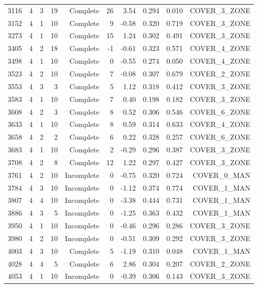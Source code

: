 \begin{tabular}{rrrrrrrrrr}
3116 & 4 & 3 & 19 & Complete & 26 & 3.54 & 0.294 & 0.010 & COVER\_3\_ZONE \\
3152 & 4 & 1 & 10 & Complete & 9 & -0.58 & 0.320 & 0.719 & COVER\_3\_ZONE \\
3273 & 4 & 1 & 10 & Complete & 15 & 1.24 & 0.302 & 0.491 & COVER\_3\_ZONE \\
3405 & 4 & 2 & 18 & Complete & -1 & -0.61 & 0.323 & 0.571 & COVER\_4\_ZONE \\
3498 & 4 & 1 & 10 & Complete & 0 & -0.55 & 0.274 & 0.050 & COVER\_4\_ZONE \\
3523 & 4 & 2 & 10 & Complete & 7 & -0.08 & 0.307 & 0.679 & COVER\_2\_ZONE \\
3553 & 4 & 3 & 3 & Complete & 5 & 1.12 & 0.318 & 0.412 & COVER\_3\_ZONE \\
3583 & 4 & 1 & 10 & Complete & 7 & 0.40 & 0.198 & 0.182 & COVER\_3\_ZONE \\
3608 & 4 & 2 & 3 & Complete & 8 & 0.52 & 0.306 & 0.546 & COVER\_6\_ZONE \\
3633 & 4 & 1 & 10 & Complete & 8 & 0.59 & 0.314 & 0.633 & COVER\_4\_ZONE \\
3658 & 4 & 2 & 2 & Complete & 6 & 0.22 & 0.328 & 0.257 & COVER\_6\_ZONE \\
3683 & 4 & 1 & 10 & Complete & 2 & -0.29 & 0.296 & 0.387 & COVER\_3\_ZONE \\
3708 & 4 & 2 & 8 & Complete & 12 & 1.22 & 0.297 & 0.427 & COVER\_3\_ZONE \\
3761 & 4 & 2 & 10 & Incomplete & 0 & -0.75 & 0.320 & 0.724 & COVER\_0\_MAN \\
3784 & 4 & 3 & 10 & Incomplete & 0 & -1.12 & 0.374 & 0.774 & COVER\_1\_MAN \\
3807 & 4 & 4 & 10 & Incomplete & 0 & -3.38 & 0.444 & 0.731 & COVER\_1\_MAN \\
3886 & 4 & 3 & 5 & Incomplete & 0 & -1.25 & 0.363 & 0.432 & COVER\_1\_MAN \\
3950 & 4 & 1 & 10 & Incomplete & 0 & -0.46 & 0.296 & 0.286 & COVER\_3\_ZONE \\
3980 & 4 & 2 & 10 & Incomplete & 0 & -0.51 & 0.309 & 0.292 & COVER\_3\_ZONE \\
4003 & 4 & 3 & 10 & Complete & 5 & -1.19 & 0.310 & 0.048 & COVER\_1\_MAN \\
4028 & 4 & 4 & 5 & Complete & 6 & 2.86 & 0.304 & 0.207 & COVER\_2\_ZONE \\
4053 & 4 & 1 & 10 & Incomplete & 0 & -0.39 & 0.306 & 0.143 & COVER\_3\_ZONE \\
\bottomrule
\end{tabular}
